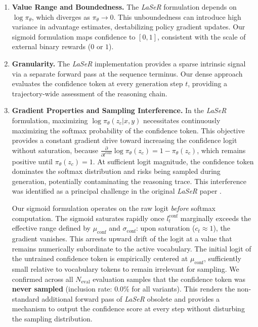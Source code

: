 \documentclass[a4paper,oneside,10pt,ngerman,english]{scrartcl}
\begin{document}
\begin{enumerate}
	\item \textbf{Value Range and Boundedness.} The \textit{LaSeR} formulation depends on $\log \pi_\theta$, which diverges as $\pi_\theta \to 0$. This unboundedness can introduce high variance in advantage estimates, destabilizing policy gradient updates. Our sigmoid formulation maps confidence to $[0,1]$, consistent with the scale of external binary rewards ($0$ or $1$).

	\item \textbf{Granularity.} The \textit{LaSeR} implementation provides a sparse intrinsic signal via a separate forward pass at the sequence terminus. Our dense approach evaluates the confidence token at every generation step $t$, providing a trajectory-wide assessment of the reasoning chain.

	\item \textbf{Gradient Properties and Sampling Interference.} In the \textit{LaSeR} formulation, maximizing $\log\pi_\theta(z_c|x,y)$ necessitates continuously maximizing the softmax probability of the confidence token. This objective provides a constant gradient drive toward increasing the confidence logit without saturation, because $\frac{\partial}{\partial l^{\mathrm{conf}}} \log \pi_\theta(z_c) = 1 - \pi_\theta(z_c)$, which remains positive until $\pi_\theta(z_c) = 1$. At sufficient logit magnitude, the confidence token dominates the softmax distribution and risks being sampled during generation, potentially contaminating the reasoning trace. This interference was identified as a principal challenge in the original \textit{LaSeR} paper \citep{laser}.

	      Our sigmoid formulation operates on the raw logit \textit{before} softmax computation. The sigmoid saturates rapidly once $l_t^{\mathrm{conf}}$ marginally exceeds the effective range defined by $\mu_{\mathrm{conf}}$ and $\sigma_{\mathrm{conf}}$: upon saturation ($c_t \approx 1$), the gradient vanishes. This arrests upward drift of the logit at a value that remains numerically subordinate to the active vocabulary. The initial logit of the untrained confidence token is empirically centered at $\mu_{\mathrm{conf}}$, sufficiently small relative to vocabulary tokens to remain irrelevant for sampling. We confirmed across all $N_{\mathrm{eval}}$ evaluation samples that the confidence token was \textbf{never sampled} (inclusion rate: $0.0\%$ for all variants). This renders the non-standard additional forward pass of \textit{LaSeR} obsolete and provides a mechanism to output the confidence score at every step without disturbing the sampling distribution.


\end{enumerate}
\end{document}
